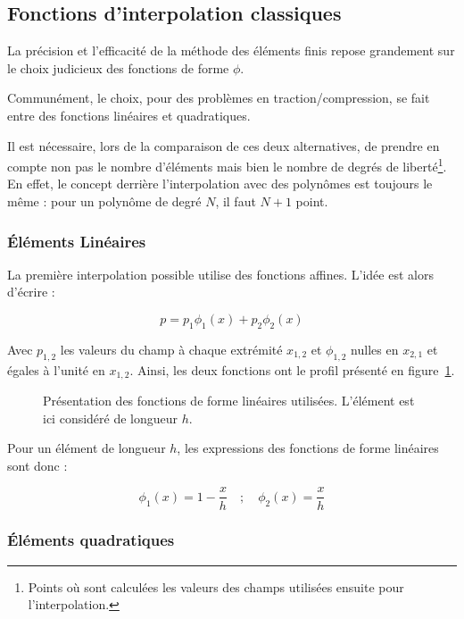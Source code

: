 \subsection{Fonctions d'interpolation classiques}

La précision et l'efficacité de la méthode des éléments finis repose grandement sur le choix judicieux des fonctions de
forme $\phi$.

Communément, le choix, pour des problèmes en traction/compression, se fait entre des fonctions linéaires et
quadratiques.

Il est nécessaire, lors de la comparaison de ces deux alternatives, de prendre en compte non pas le nombre d'éléments
mais bien le nombre de degrés de liberté\footnote{Points où sont calculées les valeurs des champs utilisées ensuite pour
l'interpolation.}. En effet, le concept derrière l'interpolation avec des polynômes est toujours le même : pour un
polynôme de degré $N$, il faut $N+1$ point.

\subsubsection{Éléments Linéaires}

La première interpolation possible utilise des fonctions affines. L'idée est alors d'écrire :

$$p = p_1\phi_1(x) + p_2\phi_2(x)$$

Avec $p_{1,2}$ les valeurs du champ à chaque extrémité $x_{1,2}$ et $\phi_{1,2}$ nulles en $x_{2,1}$ et égales à l'unité
en $x_{1,2}$. Ainsi, les deux fonctions ont le profil présenté en figure~\ref{fig:FEM:lin_shape_fun}.

\begin{figure}[!ht]
	\centering
	
	\caption{\label{fig:FEM:lin_shape_fun}Présentation des fonctions de forme linéaires utilisées. L'élément est ici considéré
	de longueur $h$.}
\end{figure}

Pour un élément de longueur $h$, les expressions des fonctions de forme linéaires sont donc :

\begin{equation*}
	\phi_1(x) = 1-\frac{x}{h} \quad;\quad \phi_2(x) = \frac{x}{h}
\end{equation*}


\subsubsection{Éléments quadratiques}

